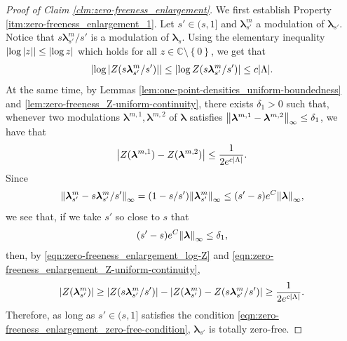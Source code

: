 \documentclass[11pt]{article}
\newcommand{\C}{\mathbb C}
\newcommand{\bl}{\bm{\lambda}}
\newcommand{\lsconst}{C}
\newcommand{\set}[1]{\left\{#1\right\}}
\numberwithin{equation}{section}
\theoremstyle{plain}
\theoremstyle{definition}
\theoremstyle{remark}
\begin{document}
\begin{proof}[Proof of Claim \ref{clm:zero-freeness_enlargement}]
We first establish Property \ref{itm:zero-freeness_enlargement_1}.
Let $s'\in(s,1]$ and $\bl_{s'}^{m}$ a modulation of $\bl_{s'}$.
Notice that $s\bl_{s'}^{m}/s'$ is a modulation of $\bl_{s}$.
Using the elementary inequality $\abs{\log\abs{z}}\le\abs{\log z}$ which holds for all $z\in\C\setminus\set{0}$, we get that 
\begin{equation}
\label{eqn:zero-freeness_enlargement_log-Z}
\abs{\log\abs{Z(s\bl_{s'}^{m}/s')}}\le\abs{\log Z(s\bl_{s'}^{m}/s')}\le c\abs{\Lambda}.
\end{equation}
At the same time, by Lemmas \ref{lem:one-point-densities_uniform-boundedness} and \ref{lem:zero-freeness_Z-uniform-continuity}, there exists $\delta_{1}>0$ such that, whenever two modulations $\bl^{m,1},\bl^{m,2}$ of $\bl$ satisfies $\norm{\bl^{m,1}-\bl^{m,2}}_{\infty}\le\delta_{1}$, we have that 
\begin{equation}
\label{eqn:zero-freeness_enlargement_Z-uniform-continuity}
\abs{Z(\bl^{m,1})-Z(\bl^{m,2})}\le\frac{1}{2e^{c\abs{\Lambda}}}.
\end{equation}
Since 
\begin{equation}
\label{eqn:zero-freeness_enlargement_activity-difference}
\norm{\bl_{s'}^{m}-s\bl_{s'}^{m}/s'}_{\infty}=(1-s/s')\norm{\bl_{s'}^{m}}_{\infty}\le(s'-s)e^{\lsconst}\norm{\bl}_{\infty},
\end{equation}
we see that, if we take $s'$ so close to $s$ that
\begin{equation}
\label{eqn:zero-freeness_enlargement_zero-free-condition}
(s'-s)e^{\lsconst}\norm{\bl}_{\infty}\le\delta_{1},
\end{equation}
then, by \eqref{eqn:zero-freeness_enlargement_log-Z} and \eqref{eqn:zero-freeness_enlargement_Z-uniform-continuity},
\begin{equation}
\label{eqn:zero-freeness_enlargement_enlarged-modulation-lower-bound}
\abs{Z(\bl_{s'}^{m})}\ge\abs{Z(s\bl_{s'}^{m}/s')}-\abs{Z(\bl_{s'}^{m})-Z(s\bl_{s'}^{m}/s')}\ge\frac{1}{2e^{c\abs{\Lambda}}}.
\end{equation}
Therefore, as long as $s'\in(s,1]$ satisfies the condition \eqref{eqn:zero-freeness_enlargement_zero-free-condition}, $\bl_{s'}$ is totally zero-free.


\end{proof}
\end{document}
